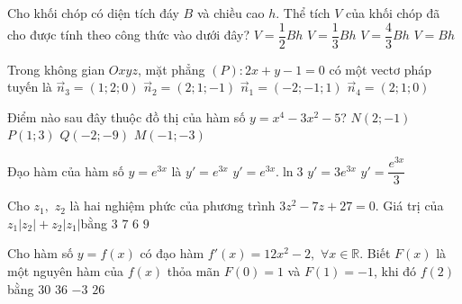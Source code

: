 \begin{ex} %
Cho khối chóp có diện tích đáy $B$ và chiều cao $h$. Thể tích $V$ của khối chóp đã cho được tính theo công thức vào dưới đây?
\choice 
{ $V=\dfrac{1}{2}Bh$}
{ \True $V=\dfrac{1}{3}Bh$}
{ $V=\dfrac{4}{3}Bh$}
{ $V=Bh$} \end{ex} 
\begin{ex} %
Trong không gian $Oxyz$, mặt phẳng $( P ):2x+y-1=0$ có một vectơ pháp tuyến là
\choice 
{ ${{\vec{n}}_{3}}=( 1;2;0 )$}
{ ${{\vec{n}}_{2}}=( 2;1;-1 )$}
{ ${{\vec{n}}_{1}}=( -2;-1;1 )$}
{ \True ${{\vec{n}}_{4}}=( 2;1;0 )$} \end{ex} 
\begin{ex} %
Điểm nào sau đây thuộc đồ thị của hàm số $y=x^4-3x^2-5$?
\choice 
{ \True $N( 2;-1 )$}
{  $P( 1;3 )$}
{  $Q( -2;-9 )$}
{  $M( -1;-3 )$} \end{ex} 
\begin{ex} %
Đạo hàm của hàm số $y={e^{3x}}$ là
\choice 
{ ${y}'={e^{3x}}$}
{ ${y}'={e^{3x}}.\ln 3$}
{ \True ${y}'=3{e^{3x}}$}
{ ${y}'=\dfrac{{e^{3x}}}{3}$} \end{ex} 
\begin{ex} %
Cho ${{z}_{1}},\,\,{{z}_{2}}$ là hai nghiệm phức của phương trình $3{{z}^2}-7z+27=0$. Giá trị của ${{z}_{1}}|{{z}_{2}} |+{{z}_{2}}| {{z}_{1}}|$bằng 
\choice 
{ $3$}
{ \True $7$}
{ $6$}
{ $9$} \end{ex} 
\begin{ex} %
Cho hàm số $y=f( x )$ có đạo hàm $f'( x )=12x^2-2,\,\,\forall x\in \mathbb{R}$. Biết $F( x )$ là một nguyên hàm của $f( x )$ thỏa mãn $F( 0 )=1$ và $F( 1 )=-1$, khi đó $f( 2 )$ bằng 
\choice 
{ $30$}
{ $36$}
{ $-3$}
{ \True $26$} \end{ex} 

